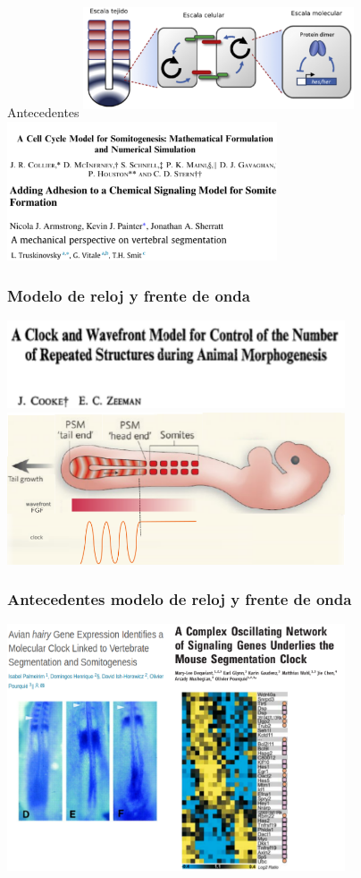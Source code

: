 \documentclass[xcolor=table, xllnames]{beamer}
\begin{document}
\begin{frame}{Antecedentes}
	\centering
	\includegraphics[width=8cm, height=3.5cm]{Figuras/escalas2.pdf}
	\includegraphics[width=8cm]{Figuras/SomitogenesisModels.pdf}
\end{frame}

\begin{frame}
	\frametitle{Modelo de reloj y frente de onda}
	\centering
	\includegraphics[width=10cm]{Figuras/FO.png} \\[.5cm]
	\includegraphics[width=10cm]{Figuras/FOinv.png}
\end{frame}


\begin{frame}
	\frametitle{Antecedentes modelo de reloj y frente de onda}%
	\centering
	\includegraphics[width=10cm]{Figuras/antecedentesFO3.png}
\end{frame}
\end{document}
